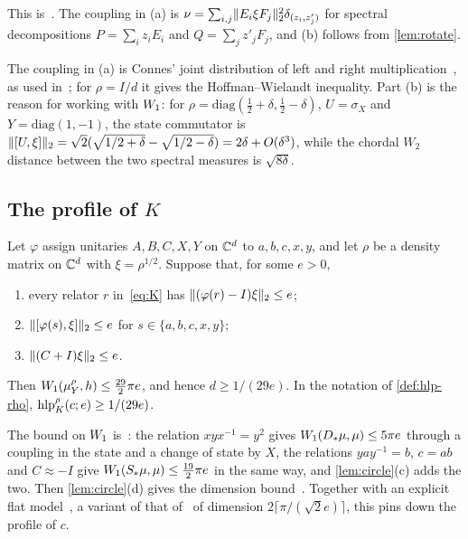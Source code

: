 This is~\cite[Lemma~11.8]{DM-game}. The coupling in (a) is
$\nu=\sum_{i,j}\lVert E_i\xi F_j\rVert_2^2\delta_{(z_i,z'_j)}$ for spectral decompositions $P=\sum_iz_iE_i$ and $Q=\sum_jz'_jF_j$, and (b)
follows from \cref{lem:rotate}.

The coupling in (a) is Connes' joint distribution of left and right multiplication~\cite[Lemma~1.2.6]{Con76}, as used
in~\cite[(5.4)]{SV18}; for $\rho=I/d$ it gives the Hoffman--Wielandt inequality. Part (b) is the reason for working with
$W_1$: for $\rho=\mathrm{diag}(\frac12+\delta,\frac12-\delta)$, $U=\sigma_X$ and $Y=\mathrm{diag}(1,-1)$, the state commutator is
$\lVert [U,\xi]\rVert_2=\sqrt2(\sqrt{1/2+\delta}-\sqrt{1/2-\delta})=2\delta+O(\delta^3)$, while the chordal $W_2$ distance between the
two spectral measures is $\sqrt{8\delta}$.

\subsection{The profile of \texorpdfstring{$K$}{K}}\label{sec:transport-K}

\begin{theorem}\label{thm:K}
Let $\varphi$ assign unitaries $A,B,C,X,Y$ on $\mathbb C^d$ to $a,b,c,x,y$, and let $\rho$ be a density matrix on $\mathbb C^d$ with
$\xi=\rho^{1/2}$. Suppose that, for some $e>0$,
\begin{enumerate}[label=(\roman*),itemsep=1pt]
\item every relator $r$ in~\eqref{eq:K} has $\lVert (\varphi(r)-I)\xi\rVert_2\le e$;
\item $\lVert [\varphi(s),\xi]\rVert_2\le e$ for $s\in\{a,b,c,x,y\}$;
\item $\lVert (C+I)\xi\rVert_2\le e$.
\end{enumerate}
Then $W_1(\mu^\rho_Y,h)\le\frac{29}2\pi e$, and hence $d\ge1/(29e)$. In the notation of \cref{def:hlp-rho},
$\operatorname{hlp}^\rho_K(c;e)\ge1/(29e)$.
\end{theorem}

The bound on $W_1$ is~\cite[Proposition~11.10]{DM-game}: the relation $xyx^{-1}=y^2$ gives
$W_1(D_*\mu,\mu)\le5\pi e$ through a coupling in the state and a change of state by $X$, the relations $yay^{-1}=b$, $c=ab$
and $C\approx-I$ give $W_1(S_*\mu,\mu)\le\frac{19}2\pi e$ in the same way, and \cref{lem:circle}(c) adds the two. Then
\cref{lem:circle}(d) gives the dimension bound~\cite[Theorem~11.9]{DM-game}. Together with an explicit flat
model~\cite[Example~11.11]{DM-game}, a variant of that of~\cite[Lemma~3.8]{SV18} of dimension $2\lceil\pi/(\sqrt2e)\rceil$, this pins
down the profile of $c$.


